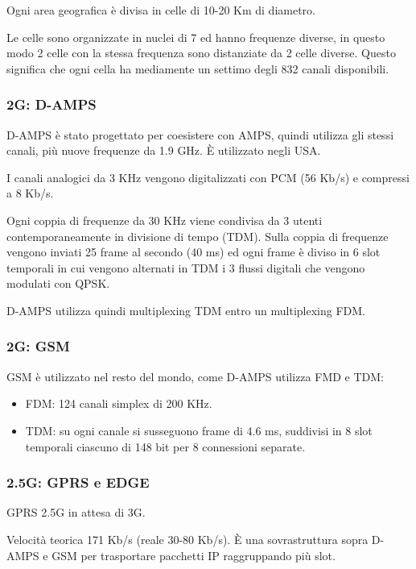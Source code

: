             Ogni area geografica è divisa in celle di 10-20 Km di diametro.

            Le celle sono organizzate in nuclei di 7 ed hanno frequenze diverse, in questo modo 2 celle con la stessa frequenza sono distanziate da 2 celle diverse. Questo significa che ogni cella ha mediamente un settimo degli 832 canali disponibili.

        \subsubsection{2G: D-AMPS}
            D-AMPS è stato progettato per coesistere con AMPS, quindi utilizza gli stessi canali, più nuove frequenze da 1.9 GHz. È utilizzato negli USA.
        
            I canali analogici da 3 KHz vengono digitalizzati con PCM (56 Kb/s) e compressi a 8 Kb/s.

            Ogni coppia di frequenze da 30 KHz viene condivisa da 3 utenti contemporaneamente in divisione di tempo (TDM). Sulla coppia di frequenze vengono inviati 25 frame al secondo (40 ms) ed ogni frame è diviso in 6 slot temporali in cui vengono alternati in TDM i 3 flussi digitali che vengono modulati con QPSK.

            D-AMPS utilizza quindi multiplexing TDM entro un multiplexing FDM.

        \subsubsection{2G: GSM}
            GSM è utilizzato nel resto del mondo, come D-AMPS utilizza FMD e TDM:
            \begin{itemize}
                \item FDM: 124 canali simplex di 200 KHz.
                \item TDM: su ogni canale si susseguono frame di 4.6 ms, suddivisi in 8 slot temporali ciascuno di 148 bit per 8 connessioni separate.
            \end{itemize}

        \subsubsection{2.5G: GPRS e EDGE}
            GPRS 2.5G in attesa di 3G.

            Velocità teorica 171 Kb/s (reale 30-80 Kb/s). È una sovrastruttura sopra D-AMPS e GSM per trasportare pacchetti IP raggruppando più slot.

